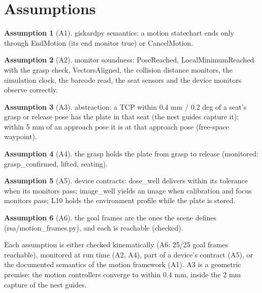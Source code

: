 \documentclass[10pt,a4paper]{article}
\theoremstyle{plain}\newtheorem{theorem}{Theorem}\newtheorem{lemma}{Lemma}\newtheorem{corollary}{Corollary}
\theoremstyle{definition}\newtheorem{definition}{Definition}\newtheorem{assumption}{Assumption}
\theoremstyle{remark}\newtheorem*{remark}{Remark}
\begin{document}
\section{Assumptions}

\begin{assumption}[A1] giskardpy semantics: a motion statechart ends only through EndMotion (its end monitor true) or CancelMotion.\end{assumption}
\begin{assumption}[A2] monitor soundness: PoseReached, LocalMinimumReached with the grasp check, VectorsAligned, the collision distance monitors, the simulation clock, the barcode read, the seat sensors and the device monitors observe correctly.\end{assumption}
\begin{assumption}[A3] abstraction: a TCP within 0.4 mm / 0.2 deg of a seat's grasp or release pose has the plate in that seat (the nest guides capture it); within 5 mm of an approach pose it is at that approach pose (free-space waypoint).\end{assumption}
\begin{assumption}[A4] the grasp holds the plate from grasp to release (monitored: grasp\_confirmed, lifted, seating).\end{assumption}
\begin{assumption}[A5] device contracts: dose\_well delivers within its tolerance when its monitors pass; image\_well yields an image when calibration and focus monitors pass; L10 holds the environment profile while the plate is stored.\end{assumption}
\begin{assumption}[A6] the goal frames are the ones the scene defines (rsa/motion\_frames.py), and each is reachable (checked). \end{assumption}
Each assumption is either checked kinematically (A6: 25/25 goal frames reachable),
monitored at run time (A2, A4), part of a device's contract (A5), or the documented semantics of the motion framework (A1).
A3 is a geometric premise: the motion controllers converge to within 0.4 mm, inside the 2 mm capture of the nest guides.
\end{document}
